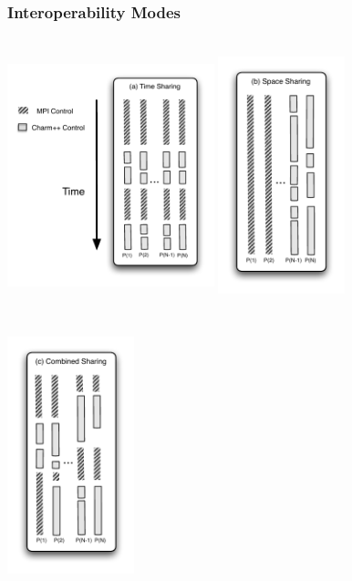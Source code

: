 \begin{frame}[fragile]
  \frametitle{Interoperability Modes}
    \includegraphics[width=0.45\textwidth,height=8cm]{figures/newInterop_a}
    \pause
    \includegraphics[width=0.275\textwidth,height=8cm]{figures/newInterop_b}
    \pause
    \includegraphics[width=0.275\textwidth,height=8cm]{figures/newInterop_c}
\end{frame}

